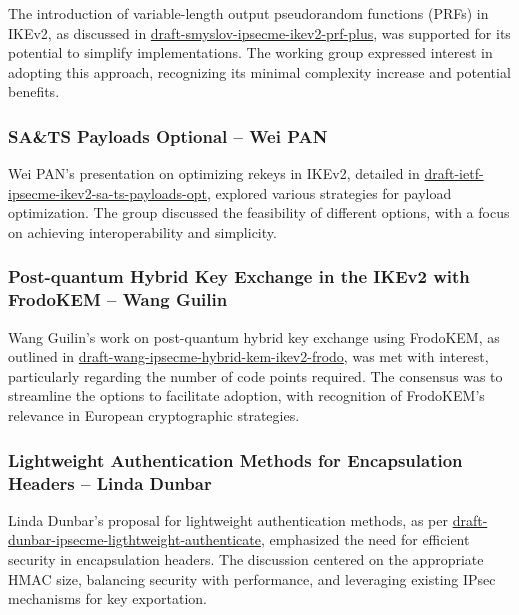 \documentclass{article}
\begin{document}
The introduction of variable-length output pseudorandom functions (PRFs) in IKEv2, as discussed in \href{https://datatracker.ietf.org/doc/html/draft-smyslov-ipsecme-ikev2-prf-plus}{draft-smyslov-ipsecme-ikev2-prf-plus}, was supported for its potential to simplify implementations. The working group expressed interest in adopting this approach, recognizing its minimal complexity increase and potential benefits.

\subsubsection{SA\&TS Payloads Optional – Wei PAN}

Wei PAN's presentation on optimizing rekeys in IKEv2, detailed in \href{https://datatracker.ietf.org/doc/html/draft-ietf-ipsecme-ikev2-sa-ts-payloads-opt}{draft-ietf-ipsecme-ikev2-sa-ts-payloads-opt}, explored various strategies for payload optimization. The group discussed the feasibility of different options, with a focus on achieving interoperability and simplicity.

\subsubsection{Post-quantum Hybrid Key Exchange in the IKEv2 with FrodoKEM – Wang Guilin}

Wang Guilin's work on post-quantum hybrid key exchange using FrodoKEM, as outlined in \href{https://datatracker.ietf.org/doc/html/draft-wang-ipsecme-hybrid-kem-ikev2-frodo}{draft-wang-ipsecme-hybrid-kem-ikev2-frodo}, was met with interest, particularly regarding the number of code points required. The consensus was to streamline the options to facilitate adoption, with recognition of FrodoKEM's relevance in European cryptographic strategies.

\subsubsection{Lightweight Authentication Methods for Encapsulation Headers – Linda Dunbar}

Linda Dunbar's proposal for lightweight authentication methods, as per \href{https://datatracker.ietf.org/doc/html/draft-dunbar-ipsecme-ligthtweight-authenticate}{draft-dunbar-ipsecme-ligthtweight-authenticate}, emphasized the need for efficient security in encapsulation headers. The discussion centered on the appropriate HMAC size, balancing security with performance, and leveraging existing IPsec mechanisms for key exportation.
\end{document}
